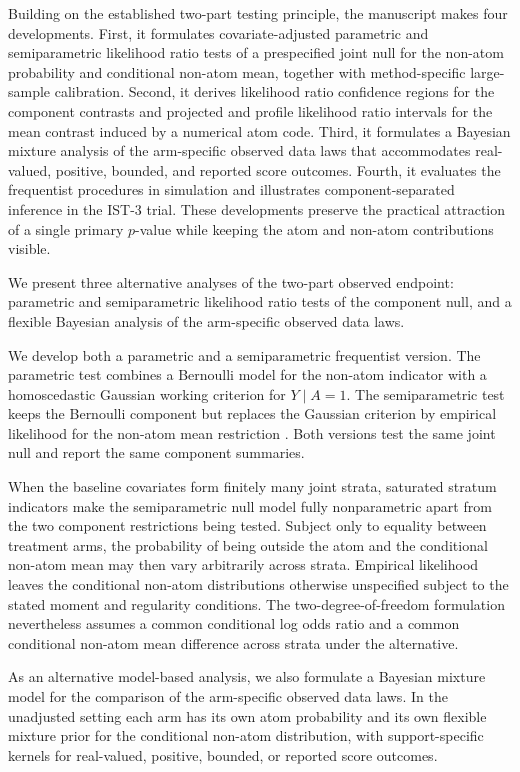 \documentclass[11pt]{article}
\begin{document}
Building on the established two-part testing principle, the manuscript makes four developments. First, it formulates covariate-adjusted parametric and semiparametric likelihood ratio tests of a prespecified joint null for the non-atom probability and conditional non-atom mean, together with method-specific large-sample calibration. Second, it derives likelihood ratio confidence regions for the component contrasts and projected and profile likelihood ratio intervals for the mean contrast induced by a numerical atom code. Third, it formulates a Bayesian mixture analysis of the arm-specific observed data laws that accommodates real-valued, positive, bounded, and reported score outcomes. Fourth, it evaluates the frequentist procedures in simulation and illustrates component-separated inference in the IST-3 trial. These developments preserve the practical attraction of a single primary $p$-value while keeping the atom and non-atom contributions visible.

We present three alternative analyses of the two-part observed endpoint: parametric and semiparametric likelihood ratio tests of the component null, and a flexible Bayesian analysis of the arm-specific observed data laws.

We develop both a parametric and a semiparametric frequentist version. The parametric test combines a Bernoulli model for the non-atom indicator with a homoscedastic Gaussian working criterion for $Y\mid A=1$. The semiparametric test keeps the Bernoulli component but replaces the Gaussian criterion by empirical likelihood for the non-atom mean restriction \citep{owen1988empirical,owen1991empirical,qin1994empirical,kitamura2001asymptotic}. Both versions test the same joint null and report the same component summaries.

When the baseline covariates form finitely many joint strata, saturated stratum indicators make the semiparametric null model fully nonparametric apart from the two component restrictions being tested. Subject only to equality between treatment arms, the probability of being outside the atom and the conditional non-atom mean may then vary arbitrarily across strata. Empirical likelihood leaves the conditional non-atom distributions otherwise unspecified subject to the stated moment and regularity conditions. The two-degree-of-freedom formulation nevertheless assumes a common conditional log odds ratio and a common conditional non-atom mean difference across strata under the alternative.

As an alternative model-based analysis, we also formulate a Bayesian mixture model for the comparison of the arm-specific observed data laws. In the unadjusted setting each arm has its own atom probability and its own flexible mixture prior for the conditional non-atom distribution, with support-specific kernels for real-valued, positive, bounded, or reported score outcomes.
\end{document}

